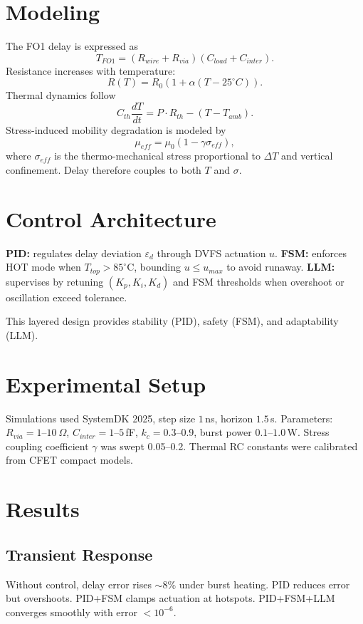 \documentclass[conference]{IEEEtran}
\begin{document}
\section{Modeling}
The FO1 delay is expressed as
\begin{equation}
T_{FO1} = (R_{wire}+R_{via})(C_{load}+C_{inter}).
\end{equation}
Resistance increases with temperature:
\begin{equation}
R(T) = R_0 \left(1 + \alpha (T-25^\circ C)\right).
\end{equation}
Thermal dynamics follow
\begin{equation}
C_{th}\frac{dT}{dt} = P\cdot R_{th} - (T - T_{amb}).
\end{equation}
Stress-induced mobility degradation is modeled by
\begin{equation}
\mu_{eff} = \mu_0 (1 - \gamma \sigma_{eff}),
\end{equation}
where $\sigma_{eff}$ is the thermo-mechanical stress proportional to $\Delta T$ and vertical confinement. Delay therefore couples to both $T$ and $\sigma$.

\section{Control Architecture}
\textbf{PID:} regulates delay deviation $\varepsilon_d$ through DVFS actuation $u$.  
\textbf{FSM:} enforces HOT mode when $T_{top}>85^\circ$C, bounding $u\leq u_{max}$ to avoid runaway.  
\textbf{LLM:} supervises by retuning $(K_p,K_i,K_d)$ and FSM thresholds when overshoot or oscillation exceed tolerance.  

This layered design provides stability (PID), safety (FSM), and adaptability (LLM).

\section{Experimental Setup}
Simulations used SystemDK 2025, step size $1$\,ns, horizon $1.5$\,s. Parameters: $R_{via}=1$--$10~\Omega$, $C_{inter}=1$--$5$\,fF, $k_c=0.3$--0.9, burst power $0.1$--$1.0$\,W. Stress coupling coefficient $\gamma$ was swept 0.05--0.2. Thermal RC constants were calibrated from CFET compact models.

\section{Results}
\subsection{Transient Response}
Without control, delay error rises $\sim$8\% under burst heating. PID reduces error but overshoots. PID+FSM clamps actuation at hotspots. PID+FSM+LLM converges smoothly with error $<10^{-6}$.
\end{document}
